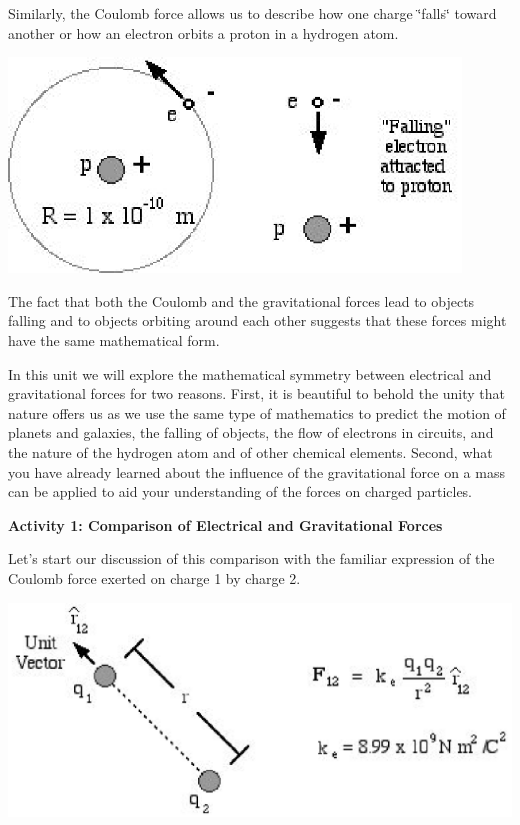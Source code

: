 Similarly, the Coulomb force allows us to describe how one charge \char`\"{}falls\char`\"{}
toward another or how an electron orbits a proton in a hydrogen atom. 

\answerspace{0.3cm}
\begin{center}
\includegraphics[width=0.9\textwidth]{elec_grav/elec_grav_fig2.eps} 
\end{center}
\answerspace{0.3cm}

The fact that both the Coulomb and the gravitational forces lead to objects
falling and to objects orbiting around each other suggests that these forces
might have the same mathematical form. 

In this unit we will explore the mathematical symmetry between electrical and
gravitational forces for two reasons. First, it is beautiful to behold the unity
that nature offers us as we use the same type of mathematics to predict the
motion of planets and galaxies, the falling of objects, the flow of electrons
in circuits, and the nature of the hydrogen atom and of other chemical elements.
Second, what you have already learned about the influence of the gravitational
force on a mass can be applied to aid your understanding of the forces on charged
particles. 

\textbf{Activity 1: Comparison of Electrical and Gravitational Forces }

Let's start our discussion of this comparison with the familiar expression of
the Coulomb force exerted on charge 1 by charge 2. 

\answerspace{0.3cm}
{\par\centering \includegraphics{elec_grav/elec_grav_fig3.eps} \par}
\answerspace{0.3cm}


